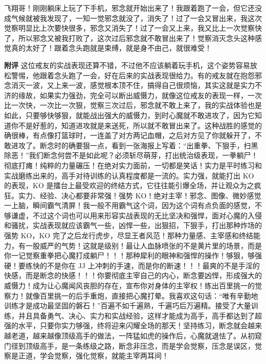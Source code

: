 \begin{case}
    飞翔哥！刚刚躺床上玩了下手机，邪念就开始出来了！我跟着跑了一会，但它还没成气候就被我发现了，一知一觉邪念就没了，消失了！过了一会又冒出来，我这次觉察明显比上次要快很多，邪念又消失了！过了一会又上来，我又比上一次觉察快了，所以邪念又被我打败了，这次过后邪念就不敢冒出来了！觉察消灭念头这种感觉真的太好了！跟着念头跑就是束缚，就是身不由己，就很难受！

    \textbf{附评} 这位戒友的实战表现还算不错，不过他不应该躺着玩手机，这个姿势容易放松警惕，他跟着念头跑了一会，好在后来的实战表现很给力。有的戒友就在抱怨邪念消灭一波，又上来一波，感觉根本顶不住，搞得自己很烦恼，其实这就是实力不济的缘故，如果实力强劲，完全可以断出威慑力，就像这位戒友的表现一样，一次比一次快，一次比一次狠，觉察三次过后，邪念就不敢上来了，我的实战体验也是如此，只要够快够狠，就能战出强大的威慑力，到时心魔就不敢进攻了，因为它知道你不是好惹的，知道进攻就是来送死，所以就不敢冒出来了。这种战胜的感觉的确很棒，有点像打篮球时，一连盖了对方两记血帽，之后对方见了你就躲开了，不敢进攻了。断念时的确要狠一点，看到一张海报上写着：“出重拳、下狠手，扫黑除恶！”我们断念何尝不是如此呢？必须斩尽萌芽，打出统治级表现，一拳躺尸！彻底打瘫！纯粹的力量碾压！在绝对实力面前，一切都是笑话！实力是平时练习和实战磨练出来的，高手对待训练的认真程度都是一流的。实力强，就能打出 KO 的表现，KO 是擂台上最受欢迎的终结方式，它往往能引爆全场，并让观众为之疯狂。实力、经验、决心都要非常强！强势 KO！绝对主宰！邪念、图像、微妙感觉一上脑，瞬间霸气清屏！我一般不用霸气这个词，因为这个词有点负面的感觉，不够谦虚，不过这个词也可以用来形容实战表现的无比坚决和强悍，面对心魔的入侵和骚扰，实战表现就应该霸气一些，凶悍一些，出狠招，下狠手，打出那种炸场的强势 KO，KO 完了之后龙行虎步，尽显王者风范！那种力量感、主宰感和终结能力，有一股威严的气势！这就是级别！最让人血脉喷张的不是黄片里的场景，而是你一记觉察重拳把心魔打成躺尸！！！那种犀利的眼神和强悍的操作！够狠，够强硬！要练快的不是你在 JJ 上冲刺的手速，而是你的断速！！！最爽的不是手淫的快感，而是断念的快感！！！你要彻底主宰自己的内心，断念要凶悍，形成强大的威慑力！成为让心魔闻风丧胆的存在，宣布你对身体的主宰权！练出百里挑一的觉察力！就像百里挑一的后手重炮，直接把心魔打晕。我喜欢这句话：“唯有辛勤地训练才是成功最坚固的磐石！”百遍不如千遍熟，千遍巧后万遍精。接受了大量训练，并且具备勇气、决心、实力和实战经验，这样才能成为高手，高手都达到了超强的水平，只要你实力够强，终将迎来闪耀全场的那天！坚持练习，断念就会越来越老道，越来越像顶级高手的做法，一阵猛如虎的操作后，心魔就退怯了。从初窥门径到顶级高手，是一条练级之路，断念非压念，而是学会觉察，压念是误区，觉察是正道，学会觉察，强化觉察，就能主宰两耳间！


\end{case}
